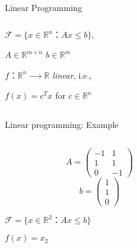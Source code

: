 \begin{frame}{Linear Programming}

    \begin{columns}
      \begin{column}{.5\textwidth}
        $
          ℱ = \{ x ∈ ℝ^n ： Ax ≤ b\}, 
          $

        \medskip   
        $A ∈ ℝ^{m ×n}$ $b ∈ ℝ^{m}$

        \bigskip 
        $f： ℝ^n ⟶ℝ$    \emph{linear}, i.e.,

        \medskip 
        $f(x) = c^Tx$ for $c ∈ ℝ^n$ 

      \end{column}
      \begin{column}{.5\textwidth}

      \end{column}       
    \end{columns}
  \end{frame}


\begin{frame}{Linear programming: Example}

    \begin{columns}
      \begin{column}{.5\textwidth}    
  \begin{displaymath}
    A =
    \begin{pmatrix}
      -1 & 1 \\
      1 & 1 \\
      0 & -1 
    \end{pmatrix}
  \end{displaymath}
  \begin{displaymath}
    b =
    \begin{pmatrix}
      1 \\ 1 \\ 0
    \end{pmatrix}
  \end{displaymath}


  \bigskip

  $ℱ = \{ x ∈ ℝ^2：  Ax ≤ b\} $ 
  
  \bigskip
  $f(x) = x_2$
  

      \end{column}
      \begin{column}{.5\textwidth}

      \end{column}       
    \end{columns}
  \end{frame}


